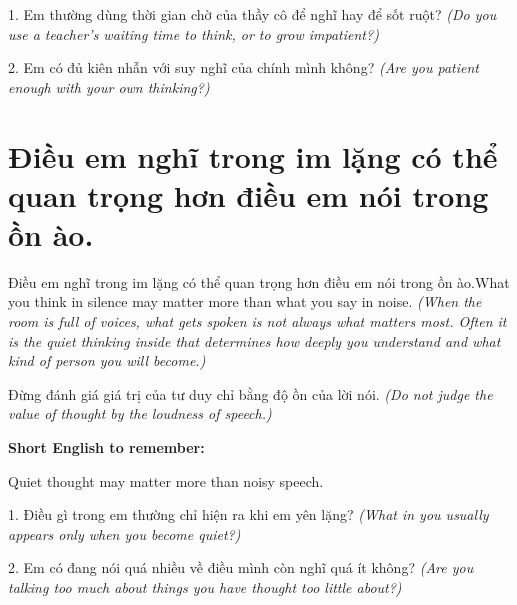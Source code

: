 \begin{tuhocnhanh}
1. Em thường dùng thời gian chờ của thầy cô để nghĩ hay để sốt ruột? \textit{(Do you use a teacher's waiting time to think, or to grow impatient?)}

2. Em có đủ kiên nhẫn với suy nghĩ của chính mình không? \textit{(Are you patient enough with your own thinking?)}
\end{tuhocnhanh}
\ngancach


\section{Điều em nghĩ trong im lặng có thể quan trọng hơn điều em nói trong ồn ào.}
\begin{truyen}{Điều em nghĩ trong im lặng có thể quan trọng hơn điều em nói trong ồn ào.}{What you think in silence may matter more than what you say in noise.}
\textit{(When the room is full of voices, what gets spoken is not always what matters most. Often it is the quiet thinking inside that determines how deeply you understand and what kind of person you will become.)}
\end{truyen}

\begin{baihoc}
Đừng đánh giá giá trị của tư duy chỉ bằng độ ồn của lời nói.
\textit{(Do not judge the value of thought by the loudness of speech.)}
\end{baihoc}

\begin{ghinhoanh}
\textbf{Short English to remember:}

Quiet thought may matter more than noisy speech.

\end{ghinhoanh}

\begin{tuhocnhanh}
1. Điều gì trong em thường chỉ hiện ra khi em yên lặng? \textit{(What in you usually appears only when you become quiet?)}

2. Em có đang nói quá nhiều về điều mình còn nghĩ quá ít không? \textit{(Are you talking too much about things you have thought too little about?)}
\end{tuhocnhanh}
\ngancach


